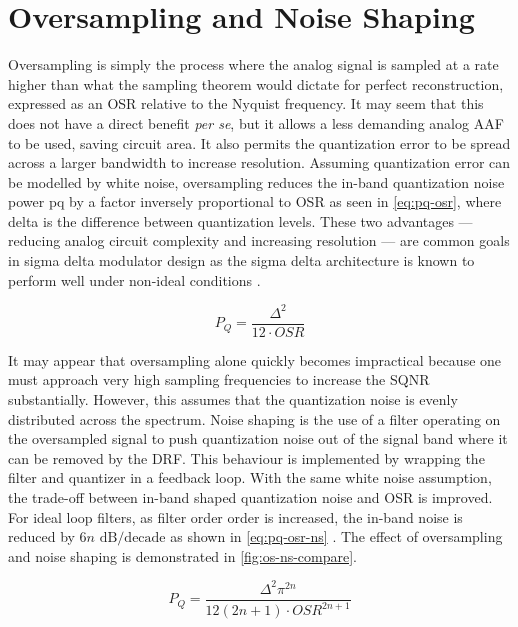 \section{Oversampling and Noise Shaping}
\label{sec:in-os-ns}

Oversampling is simply the process where the analog signal is sampled at a rate higher than what the sampling theorem would dictate for perfect reconstruction, expressed as an \gls{OSR} relative to the Nyquist frequency. It may seem that this does not have a direct benefit \emph{per se}, but it allows a less demanding analog \gls{AAF} to be used, saving circuit area. It also permits the quantization error to be spread across a larger bandwidth to increase resolution. Assuming quantization error can be modelled by white noise, oversampling reduces the in-band quantization noise power \gls{pq} by a factor inversely proportional to \gls{OSR} \cite{DeLaRosa2011} as seen in \autoref{eq:pq-osr}, where \gls{delta} is the difference between quantization levels. These two advantages --- reducing analog circuit complexity and increasing resolution --- are common goals in sigma delta modulator design as the sigma delta architecture is known to perform well under non-ideal conditions \cite{Daubechies2010}.

\begin{equation}
	P_Q = \frac{\Delta^2}{12 \cdot OSR} \label{eq:pq-osr}
\end{equation}

It may appear that oversampling alone quickly becomes impractical because one must approach very high sampling frequencies to increase the \gls{SQNR} substantially. However, this assumes that the quantization noise is evenly distributed across the spectrum. Noise shaping is the use of a filter operating on the oversampled signal to push quantization noise out of the signal band where it can be removed by the \gls{DRF}. This behaviour is implemented by wrapping the filter and quantizer in a feedback loop. With the same white noise assumption, the trade-off between in-band shaped quantization noise and \gls{OSR} is improved. For ideal loop filters, as filter order \gls{order} is increased, the in-band noise is reduced by $6n \textrm{ dB/decade}$ as shown in \autoref{eq:pq-osr-ns} \cite{DeLaRosa2011}. The effect of oversampling and noise shaping is demonstrated in \autoref{fig:os-ns-compare}. 

\begin{equation}
	P_Q = \frac{\Delta^2\pi^{2n}}{12\left(2n + 1\right) \cdot OSR^{2n + 1}} \label{eq:pq-osr-ns}
\end{equation}

